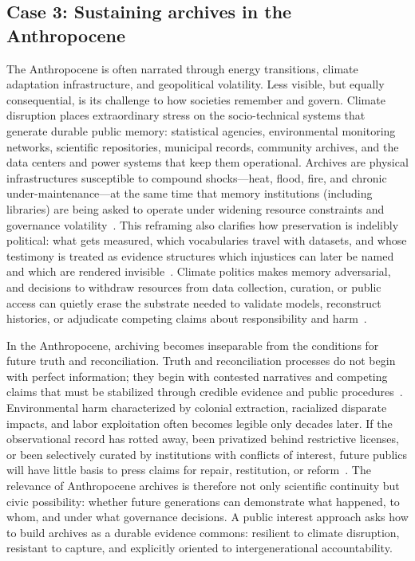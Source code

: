 \documentclass[acmsmall,screen]{acmart}
\begin{document}
\subsection*{Case 3: Sustaining archives in the Anthropocene}

The Anthropocene is often narrated through energy transitions, climate adaptation infrastructure, and geopolitical volatility. Less visible, but equally consequential, is its challenge to how societies remember and govern. Climate disruption places extraordinary stress on the socio-technical systems that generate durable public memory: statistical agencies, environmental monitoring networks, scientific repositories, municipal records, community archives, and the data centers and power systems that keep them operational. Archives are physical infrastructures susceptible to compound shocks—heat, flood, fire, and chronic under-maintenance—at the same time that memory institutions (including libraries) are being asked to operate under widening resource constraints and governance volatility~\cite{mazurczykAmericanArchivesClimate2018,orrClimateChangeCultural2021,sesanaClimateChangeImpacts2021}. This reframing also clarifies how preservation is indelibly political: what gets measured, which vocabularies travel with datasets, and whose testimony is treated as evidence structures which injustices can later be named and which are rendered invisible~\cite{woodMobilizingRecordsReframing2014,yeoConceptsRecord12007,carbajalCriticalDigitalArchives2021a}. Climate politics makes memory adversarial, and decisions to withdraw resources from data collection, curation, or public access can quietly erase the substrate needed to validate models, reconstruct histories, or adjudicate competing claims about responsibility and harm~\cite{mazurczykAmericanArchivesClimate2018,robinsonComeHellHigh2021}. 

In the Anthropocene, archiving becomes inseparable from the conditions for future truth and reconciliation. Truth and reconciliation processes do not begin with perfect information; they begin with contested narratives and competing claims that must be stabilized through credible evidence and public procedures~\cite{robinson-sweetTruthReconciliationArchivists2018,ghaddarSpectreArchiveTruth2016,viebachEvidenceUseArchives2022}. Environmental harm characterized by colonial extraction, racialized disparate impacts, and labor exploitation often becomes legible only decades later. If the observational record has rotted away, been privatized behind restrictive licenses, or been selectively curated by institutions with conflicts of interest, future publics will have little basis to press claims for repair, restitution, or reform~\cite{wessellKeepingArchivesWater2023,ghaddarSpectreArchiveTruth2016}. The relevance of Anthropocene archives is therefore not only scientific continuity but civic possibility: whether future generations can demonstrate what happened, to whom, and under what governance decisions. A public interest approach asks how to build archives as a durable evidence commons: resilient to climate disruption, resistant to capture, and explicitly oriented to intergenerational accountability.
\end{document}
